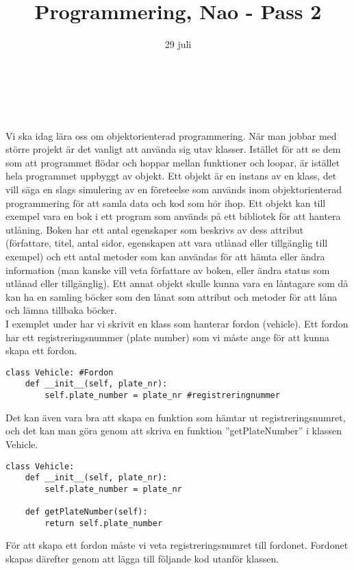 \documentclass[a4paper,12pt]{article}
\title{Programmering, Nao - Pass 2}
\date{29 juli}
\makeatletter
\let\newtitle\@title
\let\newdate\@date
\makeatother
\begin{document}
  \renewcommand*\rmdefault{ppl}\normalfont\upshape
\pagestyle{empty}
\large
\section*{\newdate\ \  \newtitle}

Vi ska idag lära oss om objektorienterad programmering. När man jobbar med större projekt är det vanligt att använda sig utav klasser. Istället för att se dem som att programmet flödar och hoppar mellan funktioner och loopar, är istället hela programmet uppbyggt av objekt. Ett objekt är en instans av en klass, det vill säga en slags simulering av en företeelse som används inom objektorienterad programmering för att samla data och kod som hör ihop. Ett objekt kan till exempel vara en bok i ett program som används på ett bibliotek för att hantera utlåning. Boken har ett antal egenskaper som beskrivs av dess attribut (författare, titel, antal sidor, egenskapen att vara utlånad eller tillgänglig till exempel) och ett antal metoder som kan användas för att hämta eller ändra information (man kanske vill veta författare av boken, eller ändra status som utlånad eller tillgänglig). Ett annat objekt skulle kunna vara en låntagare som då kan ha en samling böcker som den lånat som attribut och metoder för att låna och lämna tillbaka böcker.\\
I exemplet under har vi skrivit en klass som hanterar fordon (vehicle). Ett fordon har ett registreringsnummer (plate number) som vi måste ange för att kunna skapa ett fordon.

\begin{lstlisting}
class Vehicle: #Fordon
    def __init__(self, plate_nr):
        self.plate_number = plate_nr #registreringnummer
\end{lstlisting}

Det kan även vara bra att skapa en funktion som hämtar ut registreringsnumret, och det kan man göra genom att skriva en funktion ''getPlateNumber'' i klassen Vehicle.

\begin{lstlisting}
class Vehicle:
    def __init__(self, plate_nr):
        self.plate_number = plate_nr

    def getPlateNumber(self):
        return self.plate_number
\end{lstlisting}

För att skapa ett fordon måste vi veta registreringsnumret till fordonet. Fordonet skapas därefter genom att lägga till följande kod utanför klassen.
\end{document}
